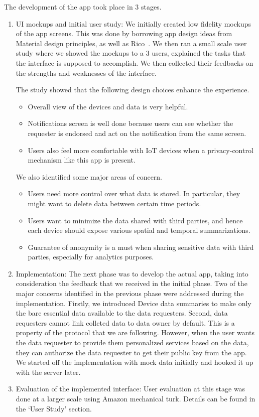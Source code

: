 The development of the app took place in 3 stages.
\begin{enumerate}
	\item UI mockups and initial user study: We initially created low fidelity mockups of the app screens. This was done by borrowing app design ideas from Material design principles, as well as Rico~\cite{rico}. We then ran a small scale user study where we showed the mockups to a 3 users, explained the tasks that the interface is supposed to accomplish. We then collected their feedbacks on the strengths and weaknesses of the interface.

	The study showed that the following design choices enhance the experience.

	\begin{itemize}
		\item Overall view of the devices and data is very helpful.
		\item Notifications screen is well done because users can see whether the requester is endorsed and act on the notification from the same screen.
		\item Users also feel more comfortable with IoT devices when a privacy-control mechanism like this app is present.
	\end{itemize}

	We also identified some major areas of concern.

	\begin{itemize}
		\item Users need more control over what data is stored. In particular, they might want to delete data between certain time periods.
		\item Users want to minimize the data shared with third parties, and hence each device should expose various spatial and temporal summarizations. 
		\item Guarantee of anonymity is a must when sharing sensitive data with third parties, especially for analytics purposes.
	\end{itemize}

	\item Implementation: The next phase was to develop the actual app, taking into consideration the feedback that we received in the initial phase. Two of the major concerns identified in the previous phase were addressed during the implementation. Firstly, we introduced Device data summaries to make only the bare essential data available to the data requesters. Second, data requesters cannot link collcted data to data owner by default. This is a property of the protocol that we are following. However, when the user wants the data requester to provide them personalized services based on the data, they can authorize the data requester to get their public key from the app. We started off the implementation with mock data initially and hooked it up with the server later.

	\item Evaluation of the implemented interface: User evaluation at this stage was done at a larger scale using Amazon mechanical turk. Details can be found in the `User Study' section.
\end{enumerate}
